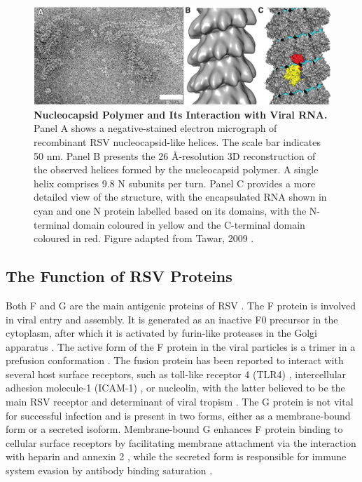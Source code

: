 \begin{figure}
    \centering
    \includegraphics[width=1\linewidth]{04. Introduction//Figs/08. N-structure.jpeg}
    \caption[Nucleocapsid Polymer and Its Interaction with Viral RNA.]{\textbf{Nucleocapsid Polymer and Its Interaction with Viral RNA.} Panel A shows a negative-stained electron micrograph of recombinant RSV nucleocapsid-like helices. The scale bar indicates 50 nm. Panel B presents the 26 \r{A}-resolution 3D reconstruction of the observed helices formed by the nucleocapsid polymer. A single helix comprises 9.8 N subunits per turn. Panel C provides a more detailed view of the structure, with the encapsulated RNA shown in cyan and one N protein labelled based on its domains, with the N-terminal domain coloured in yellow and the C-terminal domain coloured in red. Figure adapted from Tawar, 2009 \cite{Tawar2009CrystalVirus}.}
    \label{fig:Nucleocapsid Polymer and Its Interaction with Viral RNA}
\end{figure}

\subsection{The Function of RSV Proteins} \label{subsec:The Function of RSV Proteins}
Both F and G are the main antigenic proteins of RSV \cite{Collins2011ProgressYears, Battles2019RespiratoryIt}. The F protein is involved in viral entry and assembly. It is generated as an inactive F0 precursor in the cytoplasm, after which it is activated by furin-like proteases in the Golgi apparatus \cite{Collins1984NucleotideVirus.}. The active form of the F protein in the viral particles is a trimer in a prefusion conformation \cite{Ternette2007ImmunogenicityVirus}. The fusion protein has been reported to interact with several host surface receptors, such as toll-like receptor 4 (TLR4) \cite{Marr2012RoleReplication}, intercellular adhesion molecule-1 (ICAM-1) \cite{Behera2001BlockingInfection}, or nucleolin, with the latter believed to be the main RSV receptor and determinant of viral tropism \cite{Tayyari2011IdentificationVirus}. The G protein is not vital for successful infection and is present in two forms, either as a membrane-bound form or a secreted isoform. Membrane-bound G enhances F protein binding to cellular surface receptors by facilitating membrane attachment via the interaction with heparin and annexin 2 \cite{Collins2013RespiratoryDisease, Krusat1997Heparin-dependentCells, Malhotra2003IsolationCells}, while the secreted form is responsible for immune system evasion by antibody binding saturation \cite{Bukreyev2008TheLeukocytes}. 

